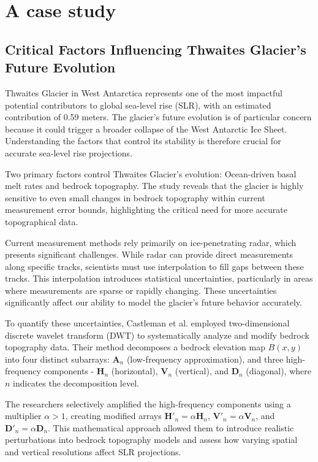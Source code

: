 \section{A case study}\label{Castleman_2022}
\subsection*{Critical Factors Influencing Thwaites Glacier's Future Evolution}

Thwaites Glacier in West Antarctica represents one of the most impactful potential contributors to global sea-level rise (SLR), with an estimated contribution of 0.59 meters. The glacier's future evolution is of particular concern because it could trigger a broader collapse of the West Antarctic Ice Sheet. Understanding the factors that control its stability is therefore crucial for accurate sea-level rise projections.

Two primary factors control Thwaites Glacier's evolution\cite{Castleman_2022}: Ocean-driven basal melt rates and bedrock topography. The study reveals that the glacier is highly sensitive to even small changes in bedrock topography within current measurement error bounds, highlighting the critical need for more accurate topographical data.

Current measurement methods rely primarily on ice-penetrating radar, which presents significant challenges. While radar can provide direct measurements along specific tracks, scientists must use interpolation to fill gaps between these tracks. This interpolation introduces statistical uncertainties, particularly in areas where measurements are sparse or rapidly changing. These uncertainties significantly affect our ability to model the glacier's future behavior accurately.

To quantify these uncertainties, Castleman et al.\cite{Castleman_2022} employed two-dimensional discrete wavelet transform (DWT) to systematically analyze and modify bedrock topography data. Their method decomposes a bedrock elevation map $B(x,y)$ into four distinct subarrays: $\mathbf{A}_n$ (low-frequency approximation), and three high-frequency components - $\mathbf{H}_n$ (horizontal), $\mathbf{V}_n$ (vertical), and $\mathbf{D}_n$ (diagonal), where $n$ indicates the decomposition level. 

The researchers selectively amplified the high-frequency components using a multiplier $\alpha > 1$, creating modified arrays $\mathbf{H}'_n = \alpha\mathbf{H}_n$, $\mathbf{V}'_n = \alpha\mathbf{V}_n$, and $\mathbf{D}'_n = \alpha\mathbf{D}_n$. This mathematical approach allowed them to introduce realistic perturbations into bedrock topography models and assess how varying spatial and vertical resolutions affect SLR projections.

